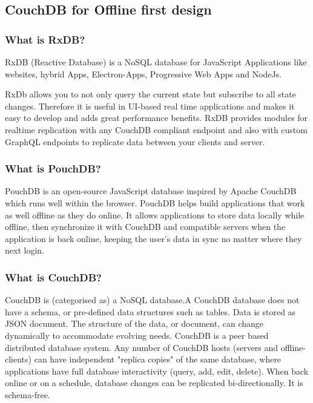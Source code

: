\subsection{CouchDB for Offline first design}

\subsubsection{What is RxDB?}

RxDB (Reactive Database) is a NoSQL database for JavaScript Applications 
like websites, hybrid Apps, Electron-Apps, Progressive Web Apps and NodeJs.

RxDb allows you to not only query the current state but subscribe to all state changes.
Therefore it is useful in UI-based real time applications and makes it easy to develop 
and adds great performance benefits.
RxDB provides modules for realtime replication with any CouchDB compliant endpoint and 
also with custom GraphQL endpoints to replicate data between your clients and server.~\cite{RxDB}

\subsubsection{What is PouchDB?}

PouchDB is an open-source JavaScript database inspired by Apache CouchDB which 
runs well within the browser. PouchDB helps build applications that work as well 
offline as they do online. It allows applications to store data locally while offline, 
then synchronize it with CouchDB and compatible servers when the application is back 
online, keeping the user's data in sync no matter where they next login.~\cite{PouchGuide}

\subsubsection{What is CouchDB?}

CouchDB is (categorised as) a NoSQL database.A CouchDB database does not have a schema, 
or pre-defined data structures such as tables. Data is stored as JSON document. 
The structure of the data, or document, can change dynamically to accommodate evolving needs.  
CouchDB is a peer based distributed database system. Any number of CouchDB hosts 
(servers and offline-clients) can have independent "replica copies" of the same database, 
where applications have full database interactivity (query, add, edit, delete). 
When back online or on a schedule, database changes can be replicated bi-directionally.
It is schema-free.~\cite{CouchConfluence}

